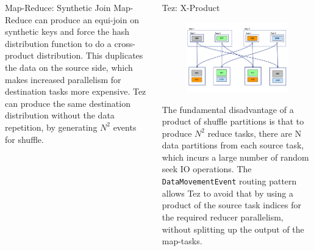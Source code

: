 \documentclass[final]{beamer}
\newlength{\onecolwid}
\newlength{\twocolwid}
\begin{document}
\begin{frame}[t]
\begin{columns}[t]
\begin{column}{\twocolwid}
\begin{columns}[t,totalwidth=\twocolwid]
\begin{column}{\onecolwid}
\begin{block}{Map-Reduce: Synthetic Join}
Map-Reduce can produce an equi-join on synthetic keys and force the hash distribution
function to do a cross-product distribution. This duplicates the data on the 
source side, which makes increased parallelism for destination tasks more expensive.
Tez can produce the same destination distribution without the data repetition, by generating 
${N}^2$ events for shuffle.

\end{block}


\end{column} %

\begin{column}{\onecolwid} %


\begin{block}{Tez: X-Product}


\begin{figure}
\includegraphics{figures/Tez-XProd-1.png}
\end{figure}

The fundamental disadvantage of a product of shuffle partitions is that to produce ${N}^2$ reduce tasks,
there are N data partitions from each source task, which incurs a large number of random seek IO operations.
The \texttt{DataMovementEvent} routing pattern allows Tez to avoid that by using a product of the source
task indices for the required reducer parallelism, without splitting up the output of the map-tasks.


\end{block}
\end{column}
\end{columns}
\end{column}
\end{columns}
\end{frame}
\end{document}
